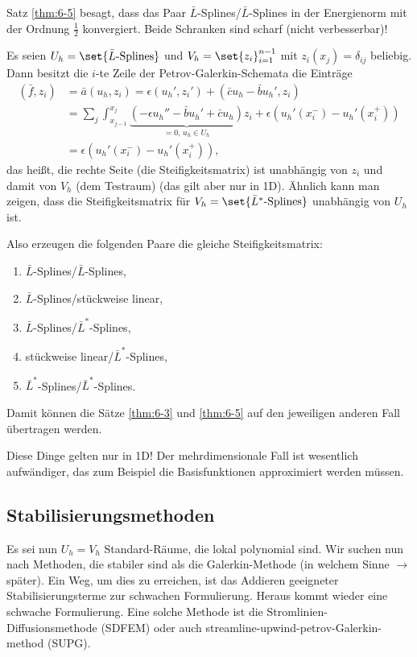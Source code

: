Satz \ref{thm:6-5} besagt, dass das Paar $\bar L$-Splines/$\bar L$-Splines in der Energienorm mit der Ordnung $\frac 12$ konvergiert. Beide Schranken sind scharf (nicht verbesserbar)!

\begin{bemerkung}\label{rem:6-6}
  Es seien $U_{h} = \set{\bar L\text{-Splines}}$ und $V_{h} = \set{z_{i}}_{i = 1}^{n-1}$ mit $z_i(x_{j}) = \delta_{ij}$ beliebig. Dann besitzt die $i$-te Zeile der Petrov-Galerkin-Schemata die Einträge
  \begin{align*}
    (\bar f, z_{i}) &= \bar a (u_{h}, z_{i}) = \epsilon(u_{h}', z_{i}') + (\bar c u_{h} - \bar b u_{h}', z_{i})\\
&= \sum_{j} \int_{x_{j-1}}^{x_{j}} \underbrace{(-\epsilon u_{h}'' - \bar b u_{h}' + \bar c u_{h})}_{= 0, \, u_{h} \in U_{h}}z_{i} + \epsilon(u_{h}'(x_{i}^{-}) - u_{h}'(x_{i}^{+})) \\
&= \epsilon(u_{h}'(x_{i}^{-}) - u_{h}'(x_{i}^{+})), 
  \end{align*}
das heißt, die rechte Seite (die Steifigkeitsmatrix) ist unabhängig von $z_{i}$ und damit von $V_{h}$ (dem Testraum) (das gilt aber nur in 1D). Ähnlich kann man zeigen, dass die Steifigkeitsmatrix für $V_{h} = \set{\bar L^{*}\text{-Splines}}$ unabhängig von $U_{h}$ ist. 

Also erzeugen die folgenden Paare die gleiche Steifigkeitsmatrix: 
\begin{enumerate}
\item $\bar L$-Splines/$\bar L$-Splines,
\item $\bar L$-Splines/stückweise linear,
\item $\bar L$-Splines/$\bar L^{*}$-Splines, 
\item stückweise linear/$\bar L^{*}$-Splines,
\item $\bar L^{*}$-Splines/$\bar L^{*}$-Splines.
\end{enumerate}
Damit können die Sätze  \ref{thm:6-3} und  \ref{thm:6-5} auf den jeweiligen anderen Fall übertragen werden. 
\end{bemerkung}
Diese Dinge gelten nur in 1D! Der mehrdimensionale Fall ist wesentlich aufwändiger, das zum Beispiel die Basisfunktionen approximiert werden müssen. 

\subsection{Stabilisierungsmethoden}
 \label{sec:stab}

 Es sei nun $U_{h} = V_{h}$ Standard-Räume, die lokal polynomial sind. Wir suchen nun nach Methoden, die stabiler sind als die Galerkin-Methode (in welchem Sinne $\to$ später). Ein Weg, um dies zu erreichen, ist das Addieren geeigneter Stabilisierungsterme zur schwachen Formulierung. Heraus kommt wieder eine schwache Formulierung. Eine solche Methode ist die Stromlinien-Diffusionsmethode (SDFEM) oder auch streamline-upwind-petrov-Galerkin-method (SUPG). 

